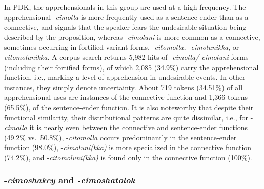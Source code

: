 \documentclass[output=paper,colorlinks,citecolor=brown]{langscibook}
\begin{document}
In PDK, the apprehensionals in this group are used at a high frequency. The apprehensional \nobreakdash-\textit{cimolla} is more frequently used as a sentence-ender than as a connective, and signals that the speaker fears the undesirable situation being described by the proposition, whereas \nobreakdash-\textit{cimoluni} is more common as a connective, sometimes occurring in fortified variant forms, \textit{-citomolla, -cimolunikka}, or \nobreakdash-\textit{citomolunikka}. A corpus search returns 5,982 hits of \textit{-cimolla/-cimoluni} forms (including their fortified forms), of which 2,085 (34.9\%) carry the apprehensional function, i.e., marking a level of apprehension in undesirable events. In other instances, they simply denote uncertainty. About 719 tokens (34.51\%) of all apprehensional uses are instances of the connective function and 1,366 tokens (65.5\%), of the sentence-ender function. It is also noteworthy that despite their functional similarity, their distributional patterns are quite dissimilar, i.e., for \nobreakdash-\textit{cimolla} it is nearly even between the connective and sentence-ender functions (49.2\% vs.\ 50.8\%), \nobreakdash-\textit{citomolla} occurs predominantly in the sentence-ender function (98.0\%), \nobreakdash-\textit{cimoluni(kka)} is more specialized in the connective function (74.2\%), and \nobreakdash-\textit{citomoluni(kka)} is found only in the connective function (100\%).



\subsubsection{-\textit{cimoshakey} and \textit{-cimoshatolok}} 
\end{document}
